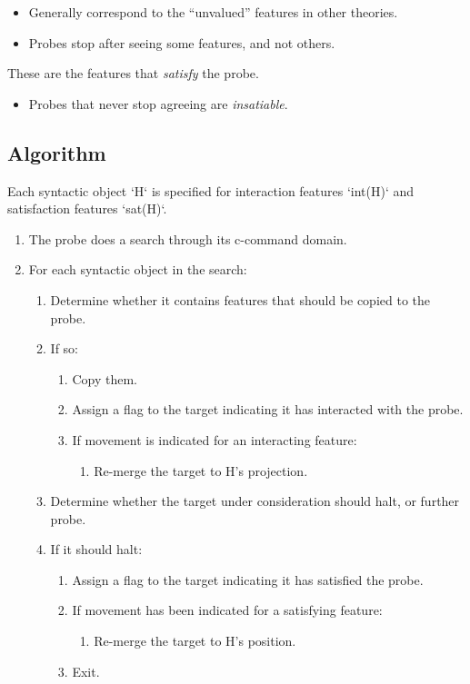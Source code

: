 \begin{itemize}
  \item Generally correspond to the ``unvalued'' features in other theories.
  \item Probes stop after seeing some features, and not others.
\end{itemize}
These are the features that \textit{satisfy} the probe.

\begin{itemize}
  \item Probes that never stop agreeing are \textit{insatiable}.
\end{itemize}

\subsection*{Algorithm}

Each syntactic object `H` is specified for interaction features `int(H)` and satisfaction features `sat(H)`.

\begin{enumerate}
  \item The probe does a search through its c-command domain.
  \item For each syntactic object in the search:
  \begin{enumerate}
    \item Determine whether it contains features that should be copied to the probe.
    \item If so:
    \begin{enumerate}
      \item Copy them.
      \item Assign a flag to the target indicating it has interacted with the probe.
      \item If movement is indicated for an interacting feature:
      \begin{enumerate}
        \item Re-merge the target to H's projection.
      \end{enumerate}
    \end{enumerate}
    \item Determine whether the target under consideration should halt, or further probe.
    \item If it should halt:
    \begin{enumerate}
      \item Assign a flag to the target indicating it has satisfied the probe.
      \item If movement has been indicated for a satisfying feature:
      \begin{enumerate}
        \item Re-merge the target to H's position.
      \end{enumerate}
      \item Exit.
    \end{enumerate}
  \end{enumerate}
\end{enumerate}

